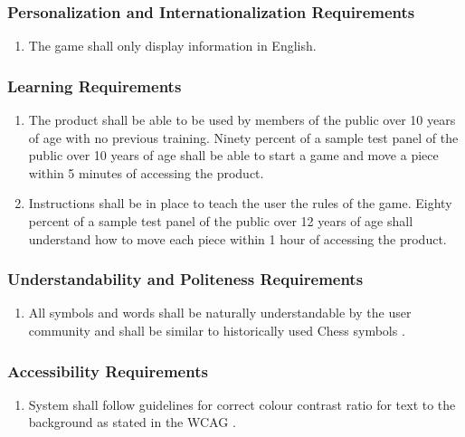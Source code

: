 \documentclass[]{article}
\begin{document}
\subsubsection{Personalization and Internationalization Requirements}
\label{ssub:personalization_and_internationalization_requirements}
\begin{enumerate}[{UH}1., leftmargin=2\parindent, resume]
	\item The game shall only display information in English.
\end{enumerate}

\subsubsection{Learning Requirements}
\label{ssub:learning_requirements}
\begin{enumerate}[{UH}1., leftmargin=2\parindent, resume]
	\item The product shall be able to be used by members of the public over 10 years of age with no previous training.
	Ninety percent of a sample test panel of the public over 10 years of age shall be able to start a game and move a piece within 5 minutes of accessing the product.
	\item Instructions shall be in place to teach the user the rules of the game. Eighty percent of a sample test panel of the public over 12 years of age shall understand how to move each piece within 1 hour of accessing the product.
\end{enumerate}

\subsubsection{Understandability and Politeness Requirements}
\label{ssub:understandability_and_politeness_requirements}
\begin{enumerate}[{UH}1., leftmargin=2\parindent, resume]
	\item All symbols and words shall be naturally understandable by the user community and shall be similar to historically used Chess symbols \cite{ChessHistory}. 
\end{enumerate}

\subsubsection{Accessibility Requirements}
\label{ssub:accessibility_requirements}
\begin{enumerate}[{UH}1., leftmargin=2\parindent, resume]
	\item System shall follow guidelines for correct colour contrast ratio for text to the background as stated in the WCAG \cite{WCAG}.
\end{enumerate}
\end{document}

